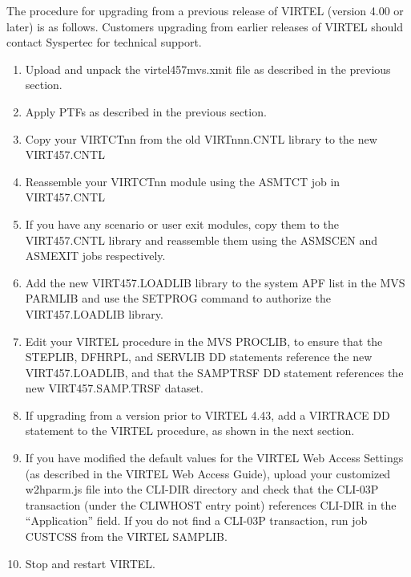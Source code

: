 \documentclass[letterpaper,10pt,english]{sphinxmanual}
\begin{document}
The procedure for upgrading from a previous release of VIRTEL (version 4.00 or later) is as follows. Customers upgrading from  earlier releases of VIRTEL should contact Syspertec for technical support.
\begin{enumerate}
\item {} 
Upload and unpack the virtel457mvs.xmit file as described in the previous section.

\item {} 
Apply PTFs as described in the previous section.

\item {} 
Copy your VIRTCTnn from the old VIRTnnn.CNTL library to the new VIRT457.CNTL

\item {} 
Reassemble your VIRTCTnn module using the ASMTCT job in VIRT457.CNTL

\item {} 
If you have any scenario or user exit modules, copy them to the VIRT457.CNTL library and reassemble them using the ASMSCEN and ASMEXIT jobs respectively.

\item {} 
Add the new VIRT457.LOADLIB library to the system APF list in the MVS PARMLIB and use the SETPROG command to authorize the VIRT457.LOADLIB library.

\item {} 
Edit your VIRTEL procedure in the MVS PROCLIB, to ensure that the STEPLIB, DFHRPL, and SERVLIB DD statements reference the new VIRT457.LOADLIB, and that the SAMPTRSF DD statement references the new VIRT457.SAMP.TRSF dataset.

\item {} 
If upgrading from a version prior to VIRTEL 4.43, add a VIRTRACE DD statement to the VIRTEL procedure, as shown in the next section.

\item {} 
If you have modified the default values for the VIRTEL Web Access Settings (as described in the VIRTEL Web Access Guide), upload your customized w2hparm.js file into the CLI-DIR directory and check that the CLI-03P transaction (under the CLIWHOST entry point) references CLI-DIR in the “Application” field. If you do not find a CLI-03P transaction, run job CUSTCSS from the VIRTEL SAMPLIB.

\item {} 
Stop and restart VIRTEL.

\end{enumerate}
\end{document}
